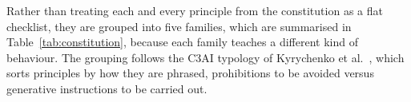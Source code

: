 %
%
%
%
%
Rather than treating each and every principle from the constitution as a flat checklist, they are grouped into five families, which are summarised in Table~\ref{tab:constitution}, because each family teaches a different kind of behaviour. The grouping follows the C3AI typology of Kyrychenko et al.\ \cite{kyrychenko2025c3aicraftingevaluatingconstitutions}, which sorts principles by how they are phrased, prohibitions to be avoided versus generative instructions to be carried out.

